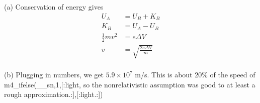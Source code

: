 (a) Conservation of energy gives
\begin{align*}
        U_A             &= U_B+K_B\\
        K_B             &= U_A-U_B\\
        \frac{1}{2}mv^2 &= e\Delta V\\
        v &= \sqrt{\frac{2e\Delta V}{m}}
\end{align*}\\
(b) Plugging in numbers, we get $5.9\times10^7$ m/s.
This is about
20\% of the speed of
m4_ifelse(__sn,1,[:light, so the nonrelativistic assumption
was good to at least a rough approximation.:],[:light.:])


